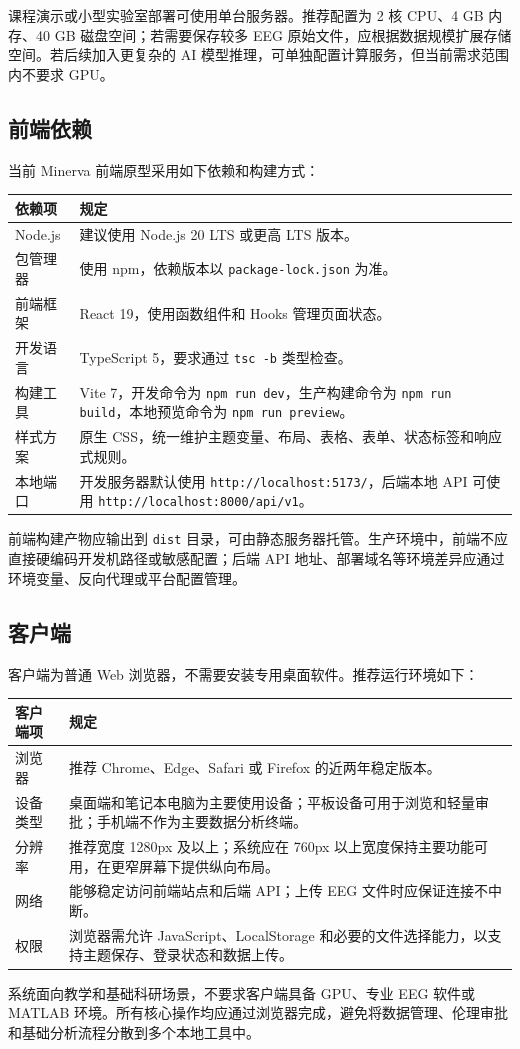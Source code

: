 课程演示或小型实验室部署可使用单台服务器。推荐配置为 2 核 CPU、4 GB 内存、40 GB 磁盘空间；若需要保存较多 EEG 原始文件，应根据数据规模扩展存储空间。若后续加入更复杂的 AI 模型推理，可单独配置计算服务，但当前需求范围内不要求 GPU。

\subsection{前端依赖}

当前 Minerva 前端原型采用如下依赖和构建方式：

\begin{longtable}{|p{34mm}|p{88mm}|}
\hline
\textbf{依赖项} & \textbf{规定} \\
\hline
Node.js & 建议使用 Node.js 20 LTS 或更高 LTS 版本。 \\
\hline
包管理器 & 使用 npm，依赖版本以 \texttt{package-lock.json} 为准。 \\
\hline
前端框架 & React 19，使用函数组件和 Hooks 管理页面状态。 \\
\hline
开发语言 & TypeScript 5，要求通过 \texttt{tsc -b} 类型检查。 \\
\hline
构建工具 & Vite 7，开发命令为 \texttt{npm run dev}，生产构建命令为 \texttt{npm run build}，本地预览命令为 \texttt{npm run preview}。 \\
\hline
样式方案 & 原生 CSS，统一维护主题变量、布局、表格、表单、状态标签和响应式规则。 \\
\hline
本地端口 & 开发服务器默认使用 \texttt{http://localhost:5173/}，后端本地 API 可使用 \texttt{http://localhost:8000/api/v1}。 \\
\hline
\end{longtable}

前端构建产物应输出到 \texttt{dist} 目录，可由静态服务器托管。生产环境中，前端不应直接硬编码开发机路径或敏感配置；后端 API 地址、部署域名等环境差异应通过环境变量、反向代理或平台配置管理。

\subsection{客户端}

客户端为普通 Web 浏览器，不需要安装专用桌面软件。推荐运行环境如下：

\begin{longtable}{|p{34mm}|p{88mm}|}
\hline
\textbf{客户端项} & \textbf{规定} \\
\hline
浏览器 & 推荐 Chrome、Edge、Safari 或 Firefox 的近两年稳定版本。 \\
\hline
设备类型 & 桌面端和笔记本电脑为主要使用设备；平板设备可用于浏览和轻量审批；手机端不作为主要数据分析终端。 \\
\hline
分辨率 & 推荐宽度 1280px 及以上；系统应在 760px 以上宽度保持主要功能可用，在更窄屏幕下提供纵向布局。 \\
\hline
网络 & 能够稳定访问前端站点和后端 API；上传 EEG 文件时应保证连接不中断。 \\
\hline
权限 & 浏览器需允许 JavaScript、LocalStorage 和必要的文件选择能力，以支持主题保存、登录状态和数据上传。 \\
\hline
\end{longtable}

系统面向教学和基础科研场景，不要求客户端具备 GPU、专业 EEG 软件或 MATLAB 环境。所有核心操作均应通过浏览器完成，避免将数据管理、伦理审批和基础分析流程分散到多个本地工具中。
